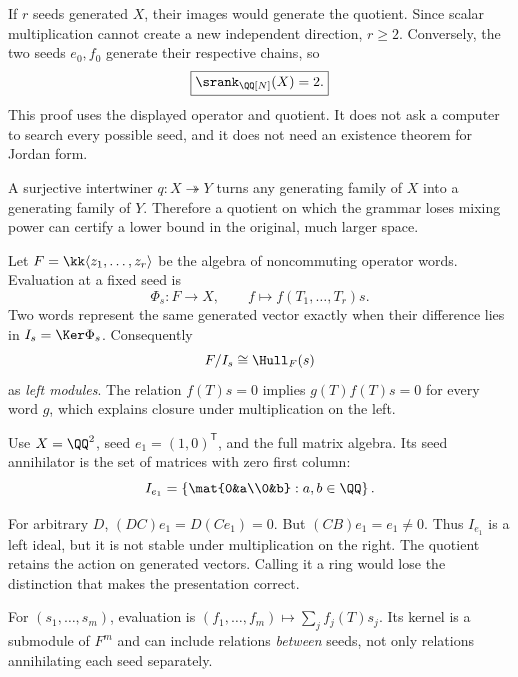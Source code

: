 If $r$ seeds generated $X$, their images would generate the quotient. Since scalar multiplication cannot create a new independent direction, $r\ge2$. Conversely, the two seeds $e_0,f_0$ generate their respective chains, so
\[
\boxed{\srank_{\QQ[N]}(X)=2.}
\]
This proof uses the displayed operator and quotient. It does not ask a computer to search every possible seed, and it does not need an existence theorem for Jordan form.

A surjective intertwiner $q:X\twoheadrightarrow Y$ turns any generating family of $X$ into a generating family of $Y$. Therefore a quotient on which the grammar loses mixing power can certify a lower bound in the original, much larger space.


Let $F=\kk\langle z_1,\ldots,z_r\rangle$ be the algebra of noncommuting operator words. Evaluation at a fixed seed is
\[
\Phi_s:F\to X,\qquad f\mapsto f(T_1,\ldots,T_r)s.
\]
Two words represent the same generated vector exactly when their difference lies in $I_s=\Ker\Phi_s$. Consequently
\[
F/I_s\cong\Hull_F(s)
\]
as \emph{left modules}. The relation $f(T)s=0$ implies $g(T)f(T)s=0$ for every word $g$, which explains closure under multiplication on the left.

Use $X=\QQ^2$, seed $e_1=(1,0)^\mathsf T$, and the full matrix algebra. Its seed annihilator is the set of matrices with zero first column:
\[
I_{e_1}=\left\{\mat{0&a\\0&b}:a,b\in\QQ\right\}.
\]


For arbitrary $D$, $(DC)e_1=D(Ce_1)=0$. But $(CB)e_1=e_1\ne0$. Thus $I_{e_1}$ is a left ideal, but it is not stable under multiplication on the right. The quotient retains the action on generated vectors. Calling it a ring would lose the distinction that makes the presentation correct.

For $(s_1,\ldots,s_m)$, evaluation is $(f_1,\ldots,f_m)\mapsto\sum_j f_j(T)s_j$. Its kernel is a submodule of $F^m$ and can include relations \emph{between} seeds, not only relations annihilating each seed separately.

